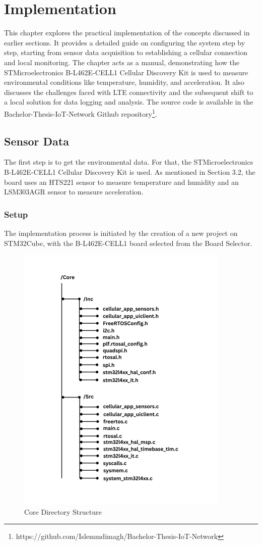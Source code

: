 \chapter{Implementation}
This chapter explores the practical implementation of the concepts discussed in earlier sections. It provides a detailed guide on configuring the system step by step, starting from sensor data acquisition to establishing a cellular connection and local monitoring. The chapter acts as a manual, demonstrating how the STMicroelectronics B-L462E-CELL1 Cellular Discovery Kit is used to measure environmental conditions like temperature, humidity, and acceleration. It also discusses the challenges faced with LTE connectivity and the subsequent shift to a local solution for data logging and analysis. The source code is available in the Bachelor-Thesis-IoT-Network Github repository\footnote{https://github.com/Islemmdimagh/Bachelor-Thesis-IoT-Network}.

\section{Sensor Data}
The first step is to get the environmental data.
For that, the STMicroelectronics B-L462E-CELL1 Cellular Discovery Kit is used. As mentioned in Section 3.2, the board uses an HTS221 sensor to measure temperature and humidity and an LSM303AGR sensor to measure acceleration.

\subsection{Setup}

The implementation process is initiated by the creation of a new project on STM32Cube, with the B-L462E-CELL1 board selected from the Board Selector.

\begin{figure}[H]
    \centering
    \includegraphics[width=0.5\linewidth]{Core.png}
    \caption{Core Directory Structure}
    \label{fig:Core Directory Structure}
\end{figure}

